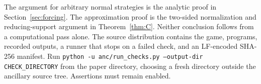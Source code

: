The argument for arbitrary normal strategies is the analytic proof in Section~\ref{sec:forcing}. The approximation proof is the two-sided normalization and reducing-support argument in Theorem~\ref{thm:C}. Neither conclusion follows from a computational pass alone. The source distribution contains the game, programs, recorded outputs, a runner that stops on a failed check, and an LF-encoded SHA-256 manifest. Run \texttt{python -u anc/run\_checks.py --output-dir CHECK\_DIRECTORY} from the paper directory, choosing a fresh directory outside the ancillary source tree. Assertions must remain enabled.
